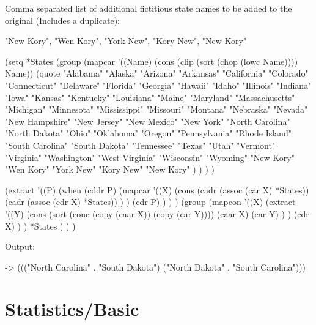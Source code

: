 \begin{itemize}
Comma separated list of additional fictitious state names to be added to
the original (Includes a duplicate):

\begin{wideverbatim}
"New Kory", "Wen Kory", "York New", "Kory New", "New Kory"
\end{wideverbatim}


\begin{wideverbatim}

(setq *States
   (group
      (mapcar '((Name) (cons (clip (sort (chop (lowc Name)))) Name))
         (quote
            "Alabama" "Alaska" "Arizona" "Arkansas"
            "California" "Colorado" "Connecticut"
            "Delaware"
            "Florida" "Georgia" "Hawaii"
            "Idaho" "Illinois" "Indiana" "Iowa"
            "Kansas" "Kentucky" "Louisiana"
            "Maine" "Maryland" "Massachusetts" "Michigan"
            "Minnesota" "Mississippi" "Missouri" "Montana"
            "Nebraska" "Nevada" "New Hampshire" "New Jersey"
            "New Mexico" "New York" "North Carolina" "North Dakota"
            "Ohio" "Oklahoma" "Oregon"
            "Pennsylvania" "Rhode Island"
            "South Carolina" "South Dakota" "Tennessee" "Texas"
            "Utah" "Vermont" "Virginia"
            "Washington" "West Virginia" "Wisconsin" "Wyoming"
            "New Kory" "Wen Kory" "York New" "Kory New" "New Kory" ) ) ) )

(extract
   '((P)
      (when (cddr P)
         (mapcar
            '((X)
               (cons
                  (cadr (assoc (car X) *States))
                  (cadr (assoc (cdr X) *States)) ) )
            (cdr P) ) ) )
   (group
      (mapcon
         '((X)
            (extract
               '((Y)
                  (cons
                     (sort (conc (copy (caar X)) (copy (car Y))))
                     (caar X)
                     (car Y) ) )
               (cdr X) ) )
         *States ) ) )

Output:

-> ((("North Carolina" . "South Dakota") ("North Dakota" . "South Carolina")))

\end{wideverbatim}

\pagebreak{}
\section*{Statistics/Basic}


\end{itemize}
